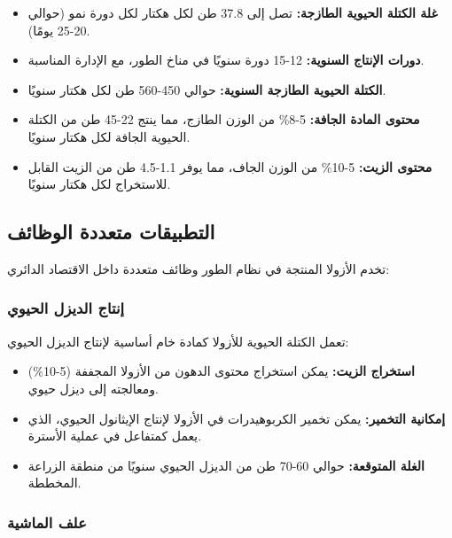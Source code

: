 \begin{itemize}
    \item \textbf{غلة الكتلة الحيوية الطازجة:} تصل إلى 37.8 طن لكل هكتار لكل دورة نمو (حوالي 20-25 يومًا).
    
    \item \textbf{دورات الإنتاج السنوية:} 12-15 دورة سنويًا في مناخ الطور، مع الإدارة المناسبة.
    
    \item \textbf{الكتلة الحيوية الطازجة السنوية:} حوالي 450-560 طن لكل هكتار سنويًا.
    
    \item \textbf{محتوى المادة الجافة:} 5-8\% من الوزن الطازج، مما ينتج 22-45 طن من الكتلة الحيوية الجافة لكل هكتار سنويًا.
    
    \item \textbf{محتوى الزيت:} 5-10\% من الوزن الجاف، مما يوفر 1.1-4.5 طن من الزيت القابل للاستخراج لكل هكتار سنويًا.
\end{itemize}

\subsection{التطبيقات متعددة الوظائف}

تخدم الأزولا المنتجة في نظام الطور وظائف متعددة داخل الاقتصاد الدائري:

\subsubsection{إنتاج الديزل الحيوي}

تعمل الكتلة الحيوية للأزولا كمادة خام أساسية لإنتاج الديزل الحيوي:

\begin{itemize}
    \item \textbf{استخراج الزيت:} يمكن استخراج محتوى الدهون من الأزولا المجففة (5-10\%) ومعالجته إلى ديزل حيوي.
    
    \item \textbf{إمكانية التخمير:} يمكن تخمير الكربوهيدرات في الأزولا لإنتاج الإيثانول الحيوي، الذي يعمل كمتفاعل في عملية الأسترة.
    
    \item \textbf{الغلة المتوقعة:} حوالي 60-70 طن من الديزل الحيوي سنويًا من منطقة الزراعة المخططة.
\end{itemize}

\subsubsection{علف الماشية}

